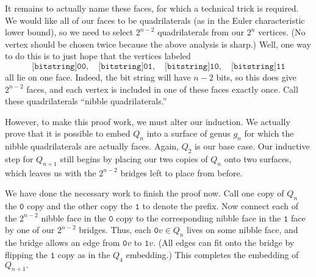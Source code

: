 It remains to actually name these faces, for which a technical trick is required. We would like all of our faces to be quadrilaterals (as in the Euler characteristic lower bound), so we need to select $2^{n-2}$ quadrilaterals from our $2^n$ vertices. (No vertex should be chosen twice because the above analysis is sharp.) Well, one way to do this is to just hope that the vertices labeled
\[\texttt{[bitstring]00},\quad\texttt{[bitstring]01},\quad\texttt{[bitstring]10},\quad\texttt{[bitstring]11}\]
all lie on one face. Indeed, the bit string will have $n-2$ bits, so this does give $2^{n-2}$ faces, and each vertex is included in one of these faces exactly once. Call these quadrilaterals ``nibble quadrilaterals.''

However, to make this proof work, we must alter our induction. We actually prove that it is possible to embed $Q_n$ into a surface of genus $g_n$ for which the nibble quadrilaterals are actually faces. Again, $Q_2$ is our base case. Our inductive step for $Q_{n+1}$ still begins by placing our two copies of $Q_n$ onto two surfaces, which leaves us with the $2^{n-2}$ bridges left to place from before.

We have done the necessary work to finish the proof now. Call one copy of $Q_n$ the $\texttt{0}$ copy and the other copy the $\texttt{1}$ to denote the prefix. Now connect each of the $2^{n-2}$ nibble face in the $\texttt{0}$ copy to the corresponding nibble face in the $\texttt{1}$ face by one of our $2^{n-2}$ bridges. Thus, each $\texttt{0}v\in Q_n$ lives on some nibble face, and the bridge allows an edge from $\texttt{0}v$ to $\texttt{1}v.$ (All edges can fit onto the bridge by flipping the $\texttt{1}$ copy as in the $Q_4$ embedding.) This completes the embedding of $Q_{n+1}.$

